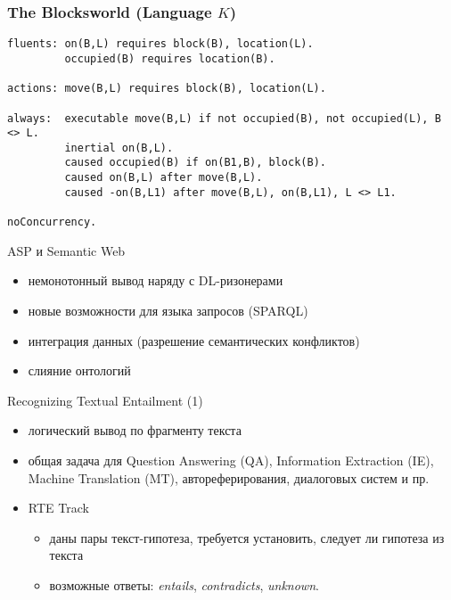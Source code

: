 \documentclass{beamer}
\begin{document}
\begin{frame}[fragile]
\frametitle{The Blocksworld (Language $K$)}
{\scriptsize \begin{verbatim}
fluents: on(B,L) requires block(B), location(L).
         occupied(B) requires location(B).

actions: move(B,L) requires block(B), location(L).

always:  executable move(B,L) if not occupied(B), not occupied(L), B <> L.
         inertial on(B,L).
         caused occupied(B) if on(B1,B), block(B).
         caused on(B,L) after move(B,L).
         caused -on(B,L1) after move(B,L), on(B,L1), L <> L1.

noConcurrency.
\end{verbatim}}
\end{frame}

\begin{frame}{ASP и Semantic Web}
\begin{itemize}
  \item немонотонный вывод наряду с DL-ризонерами
  \item новые возможности для языка запросов (SPARQL)
  \item интеграция данных (разрешение семантических конфликтов)
  \item слияние онтологий
\end{itemize}
\end{frame}

\begin{frame}{Recognizing Textual Entailment (1)}
\begin{itemize}
  \item логический вывод по фрагменту текста
  \item общая задача для Question Answering (QA), Information Extraction (IE), Machine Translation (MT), автореферирования, диалоговых систем и пр.
  \item RTE Track
    \begin{itemize}
      \item даны пары текст-гипотеза, требуется установить, следует ли гипотеза из текста
      \item возможные ответы: \textit{entails}, \textit{contradicts}, \textit{unknown}.
    \end{itemize}
\end{itemize}
\end{frame}
\end{document}

